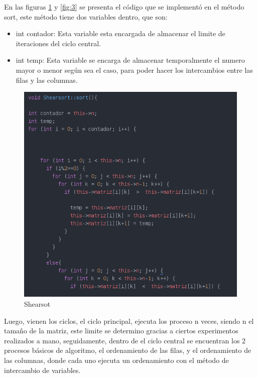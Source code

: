 \documentclass[11pt]{article}
\begin{document}
En las figuras \ref{fig:2} y \ref{fig:3} se presenta el código que se implementó en el método sort, este método tiene dos variables dentro, que son:
\begin{itemize}
\item int contador: Esta variable esta encargada de almacenar el limite de iteraciones del ciclo central.
\item int temp:  Esta variable se encarga de almacenar temporalmente el numero mayor o menor según sea el caso, para poder hacer los intercambios entre las filas y las columnas.
\end{itemize}

\begin{figure}[H]
\centering
\includegraphics[scale=0.8]{s1.png}
\caption{Shearsot}
\label{fig:2}
\end{figure}

Luego, vienen los ciclos, el ciclo principal, ejecuta los proceso n veces, siendo n el tamaño de la matriz, este limite se determino gracias a ciertos experimentos realizados a mano, seguidamente, dentro de el ciclo central se encuentran los 2 procesos básicos de algoritmo, el ordenamiento de las filas, y el ordenamiento de las columnas, donde cada uno ejecuta un ordenamiento con el método de intercambio de variables.
\end{document}
